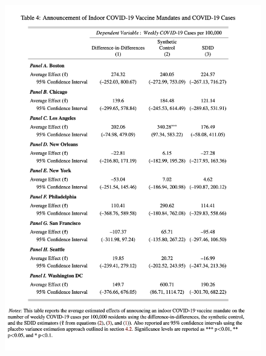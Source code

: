 \documentclass{beamer}
\begin{document}
\begin{frame}[plain]

	\begin{figure}
	\includegraphics[scale=0.3]{./lecture_includes/vitor_table4}
	\end{figure}

\end{frame}
\end{document}
